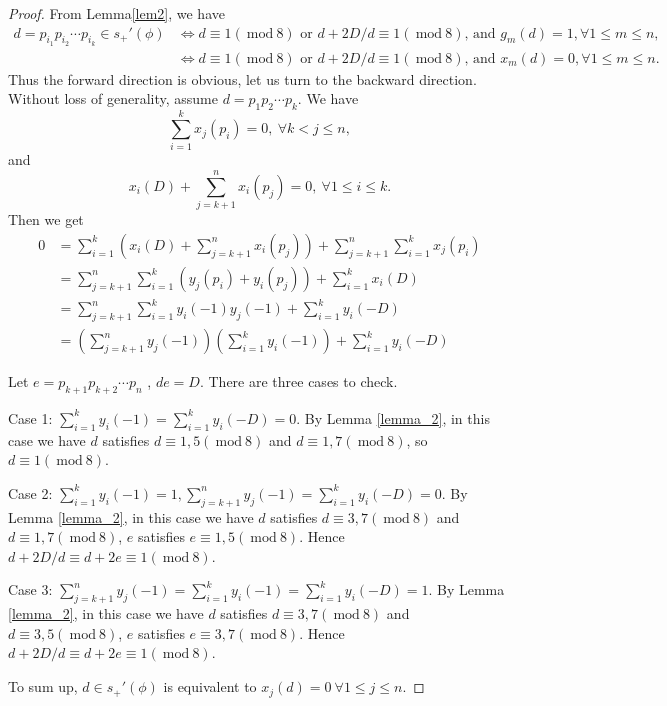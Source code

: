 \documentclass{amsart}
\numberwithin{equation}{section}
\theoremstyle{plain}
\theoremstyle{definition}
\newcommand{\pf}[1]{\begin{proof}#1\end{proof}}
\renewcommand{\mod}[1]{\ \mathrm{mod}\ #1}  %
\begin{document}
\pf{
	From Lemma\ref{lem2}, we have
$$
\begin{aligned}
d = p_{i_1}p_{i_2} \cdots p_{i_k}  \in s_+'(\phi) & \Leftrightarrow d \equiv 1 (\mod 8) \text{ or } d + 2D/d \equiv 1 (\mod 8)\text{, and }  g_{m}(d) = 1, \forall 1\leq m \leq n, \\
& \Leftrightarrow d \equiv 1 (\mod 8) \text{ or } d + 2D/d \equiv 1 (\mod 8)\text{, and } x_{m}(d) = 0, \forall 1\leq m \leq n .
\end{aligned}
$$
Thus the forward direction is obvious, let us turn to the backward direction. Without loss of generality, assume $d = p_{1}p_{2}\cdots p_{k}$. We have
	$$ \sum\limits_{i = 1}^{k} x_{j}(p_i) = 0,\ \forall  k < j \le n,$$
	and
	$$  x_{i}(D) +\sum\limits_{j = k+1}^{n} x_{i}(p_j) = 0, \   \forall 1 \le i \le k. $$
	Then we get
	$$
	\begin{aligned}
	0 &= \sum\limits_{i = 1}^{k} (x_{i}(D) +\sum\limits_{j = k+1}^{n} x_{i}(p_j) ) + \sum\limits_{j = k+1}^{n}\sum\limits_{i = 1}^{k}x_{j}(p_i)  \\
	 &= \sum\limits_{j = k+1}^{n}\sum\limits_{i = 1}^{k}(y_{j}(p_i) + y_{i}(p_j)) + \sum\limits_{i = 1}^{k} x_{i}(D)\\
	 &= \sum\limits_{j = k+1}^{n}\sum\limits_{i = 1}^{k} y_{i}(-1)y_{j}(-1) + \sum\limits_{i = 1}^{k} y_{i}(-D)\\
	 &= (\sum\limits_{j = k+1}^{n} y_{j}(-1))(\sum\limits_{i = 1}^{k}y_{i}(-1)) + \sum\limits_{i = 1}^{k} y_{i}(-D)
	\end{aligned}
	$$

	 Let $e = p_{k+1}p_{k+2}\cdots p_{n}$ , $de = D$. There are three cases to check.

	Case 1: $\sum\limits_{i = 1}^{k}y_{i}(-1) = \sum\limits_{i = 1}^{k} y_{i}(-D) = 0 $. By Lemma \ref{lemma_2}, in this case we have $d$ satisfies $d \equiv 1,5 (\mod 8)$ and $d \equiv 1,7 (\mod 8)$, so $d \equiv 1 (\mod 8) $.

	Case 2: $\sum\limits_{i = 1}^{k}y_{i}(-1) = 1, \sum\limits_{j = k+1}^{n} y_{j}(-1)  = \sum\limits_{i = 1}^{k} y_{i}(-D) = 0 $. By Lemma \ref{lemma_2}, in this case we have $d$ satisfies $d \equiv 3,7 (\mod 8)$ and $d \equiv 1,7 (\mod 8)$, $e$ satisfies  $e \equiv 1,5 (\mod 8)$. Hence $d + 2D/d \equiv d + 2e \equiv 1 (\mod 8)$.

	Case 3: $\sum\limits_{j = k+1}^{n} y_{j}(-1) = \sum\limits_{i = 1}^{k}y_{i}(-1) = \sum\limits_{i = 1}^{k} y_{i}(-D) = 1$.  By Lemma \ref{lemma_2}, in this case we have $d$ satisfies  $d \equiv 3,7 (\mod 8)$ and $d \equiv 3,5 (\mod 8)$, $e$ satisfies  $e \equiv 3,7 (\mod 8)$. Hence $d + 2D/d \equiv d + 2e \equiv 1 (\mod 8)$.

	To sum up, $d \in s_+'(\phi)$ is equivalent to $x_{j}(d) = 0 \ \forall 1\le j \le n$.
}
\end{document}

